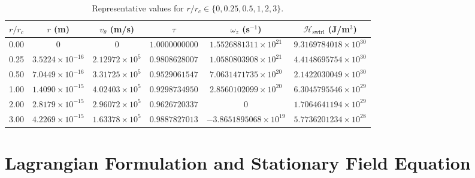 \documentclass[12pt]{article}
\newcommand{\rc}{r_c}
\begin{document}
\begin{tcolorbox}[enhanced, breakable, sharp corners, colback=gray!2, colframe=black!40, title={Swirl-Based Hamiltonian, Time Dilation, and Emergent Geometry in VAM}]
        \begin{table}[h!]
            \centering
            \caption{Representative values for \(r/\rc\in\{0,0.25,0.5,1,2,3\}\).}
            \small
            \begin{tabular}{@{}cccccc@{}}
                \toprule
                \(r/\rc\) & \(r\) (m) & \(v_\theta\) (m/s) & \(\tau\) & \(\omega_z\) (s\(^{-1}\)) & \(\mathcal{H}_{\text{swirl}}\) (J/m\(^3\)) \\
                \midrule
                0.00 & \(0\) & \(0\) & \(1.0000000000\) & \(1.5526881311\times10^{21}\) & \(9.3169784018\times10^{30}\) \\
                0.25 & \(3.5224\times10^{-16}\) & \(2.12972\times10^{5}\) & \(0.9808628007\) & \(1.0580803908\times10^{21}\) & \(4.4148695754\times10^{30}\) \\
                0.50 & \(7.0449\times10^{-16}\) & \(3.31725\times10^{5}\) & \(0.9529061547\) & \(7.0631471735\times10^{20}\) & \(2.1422030049\times10^{30}\) \\
                1.00 & \(1.4090\times10^{-15}\) & \(4.02403\times10^{5}\) & \(0.9298734950\) & \(2.8560102099\times10^{20}\) & \(6.3045795546\times10^{29}\) \\
                2.00 & \(2.8179\times10^{-15}\) & \(2.96072\times10^{5}\) & \(0.9626720337\) & \(0\) & \(1.7064641194\times10^{29}\) \\
                3.00 & \(4.2269\times10^{-15}\) & \(1.63378\times10^{5}\) & \(0.9887827013\) & \(-3.8651895068\times10^{19}\) & \(5.7736201234\times10^{28}\) \\
                \bottomrule
            \end{tabular}
        \end{table}

        \section{Lagrangian Formulation and Stationary Field Equation}
        \label{subsec:lagrangian_swirl}


\end{tcolorbox}
\end{document}
